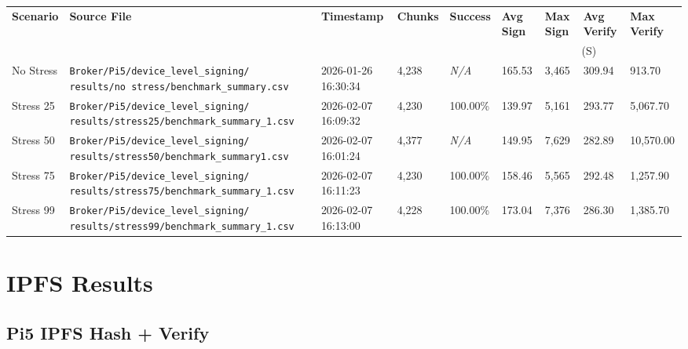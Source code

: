 \documentclass[11pt,letterpaper]{article}
\newcommand{\us}{\textmu{}S}   %
\newcommand{\code}[1]{\texttt{#1}}
\newcommand{\na}{\textit{N/A}}
\begin{document}
\begin{adjustbox}{max width=\linewidth}
\begin{tabular}{@{}L{2cm}L{7.5cm}L{3.5cm}R{1.5cm}R{1.5cm}R{1.5cm}R{1.5cm}R{1.8cm}R{1.8cm}@{}}
\toprule
\textbf{Scenario} & \textbf{Source File} & \textbf{Timestamp} &
\textbf{Chunks} & \textbf{Success} &
\textbf{Avg Sign} & \textbf{Max Sign} & \textbf{Avg Verify} & \textbf{Max Verify} \\
 & & & & & \multicolumn{4}{c}{(\us)} \\
\midrule
No Stress &
  \code{Broker/Pi5/device\_level\_signing/} \code{results/no~stress/benchmark\_summary.csv} &
  2026-01-26 16:30:34 & 4,238 & \na & 165.53 & 3,465 & 309.94 & 913.70 \\
Stress 25 &
  \code{Broker/Pi5/device\_level\_signing/} \code{results/stress25/benchmark\_summary\_1.csv} &
  2026-02-07 16:09:32 & 4,230 & 100.00\% & 139.97 & 5,161 & 293.77 & 5,067.70 \\
Stress 50 &
  \code{Broker/Pi5/device\_level\_signing/} \code{results/stress50/benchmark\_summary1.csv} &
  2026-02-07 16:01:24 & 4,377 & \na & 149.95 & 7,629 & 282.89 & 10,570.00 \\
Stress 75 &
  \code{Broker/Pi5/device\_level\_signing/} \code{results/stress75/benchmark\_summary\_1.csv} &
  2026-02-07 16:11:23 & 4,230 & 100.00\% & 158.46 & 5,565 & 292.48 & 1,257.90 \\
Stress 99 &
  \code{Broker/Pi5/device\_level\_signing/} \code{results/stress99/benchmark\_summary\_1.csv} &
  2026-02-07 16:13:00 & 4,228 & 100.00\% & 173.04 & 7,376 & 286.30 & 1,385.70 \\
\bottomrule
\end{tabular}
\end{adjustbox}

\section{IPFS Results}

\subsection{Pi5 IPFS Hash + Verify}
\end{document}
